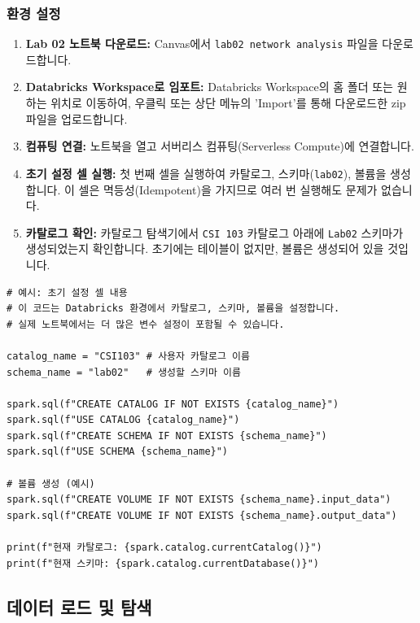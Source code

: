 \documentclass[11pt,a4paper]{article}
\theoremstyle{definition}
\begin{document}
\subsubsection{환경 설정}
\begin{enumerate}
    \item \textbf{Lab 02 노트북 다운로드:} Canvas에서 \texttt{lab02 network analysis} 파일을 다운로드합니다.
    \item \textbf{Databricks Workspace로 임포트:} Databricks Workspace의 홈 폴더 또는 원하는 위치로 이동하여, 우클릭 또는 상단 메뉴의 'Import'를 통해 다운로드한 zip 파일을 업로드합니다.
    \item \textbf{컴퓨팅 연결:} 노트북을 열고 서버리스 컴퓨팅(Serverless Compute)에 연결합니다.
    \item \textbf{초기 설정 셀 실행:} 첫 번째 셀을 실행하여 카탈로그, 스키마(\texttt{lab02}), 볼륨을 생성합니다. 이 셀은 멱등성(Idempotent)을 가지므로 여러 번 실행해도 문제가 없습니다.
    \item \textbf{카탈로그 확인:} 카탈로그 탐색기에서 \texttt{CSI 103} 카탈로그 아래에 \texttt{Lab02} 스키마가 생성되었는지 확인합니다. 초기에는 테이블이 없지만, 볼륨은 생성되어 있을 것입니다.
\end{enumerate}

\begin{lstlisting}[label={lst:lab02_setup}]
# 예시: 초기 설정 셀 내용
# 이 코드는 Databricks 환경에서 카탈로그, 스키마, 볼륨을 설정합니다.
# 실제 노트북에서는 더 많은 변수 설정이 포함될 수 있습니다.

catalog_name = "CSI103" # 사용자 카탈로그 이름
schema_name = "lab02"   # 생성할 스키마 이름

spark.sql(f"CREATE CATALOG IF NOT EXISTS {catalog_name}")
spark.sql(f"USE CATALOG {catalog_name}")
spark.sql(f"CREATE SCHEMA IF NOT EXISTS {schema_name}")
spark.sql(f"USE SCHEMA {schema_name}")

# 볼륨 생성 (예시)
spark.sql(f"CREATE VOLUME IF NOT EXISTS {schema_name}.input_data")
spark.sql(f"CREATE VOLUME IF NOT EXISTS {schema_name}.output_data")

print(f"현재 카탈로그: {spark.catalog.currentCatalog()}")
print(f"현재 스키마: {spark.catalog.currentDatabase()}")
\end{lstlisting}

\subsection{데이터 로드 및 탐색}
\end{document}
